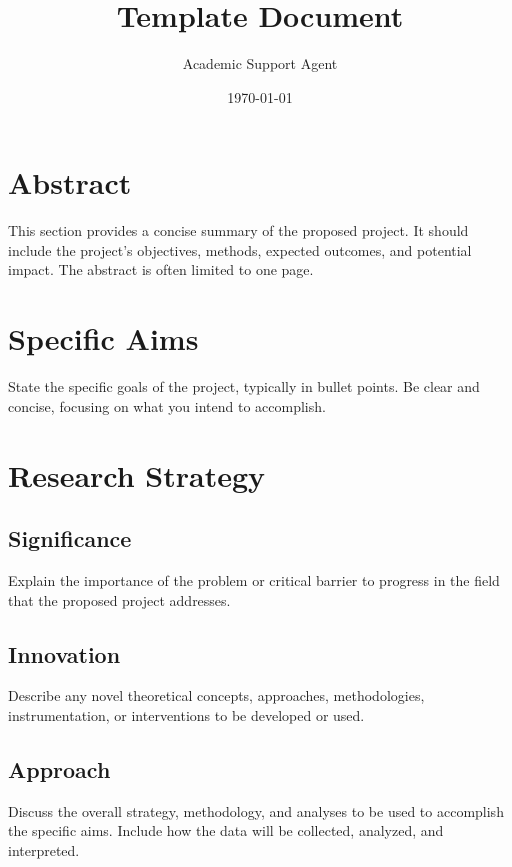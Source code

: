 \documentclass{article}
\title{Template Document}
\author{Academic Support Agent}
\date{\today}
\begin{document}
\maketitle

\maketitle

\newpage

\section*{Abstract}
This section provides a concise summary of the proposed project. It should include the project's objectives, methods, expected outcomes, and potential impact. The abstract is often limited to one page.

\newpage

\section{Specific Aims}
State the specific goals of the project, typically in bullet points. Be clear and concise, focusing on what you intend to accomplish.

\newpage

\section{Research Strategy}
\subsection{Significance}
Explain the importance of the problem or critical barrier to progress in the field that the proposed project addresses.

\subsection{Innovation}
Describe any novel theoretical concepts, approaches, methodologies, instrumentation, or interventions to be developed or used.

\subsection{Approach}
Discuss the overall strategy, methodology, and analyses to be used to accomplish the specific aims. Include how the data will be collected, analyzed, and interpreted.
\end{document}
